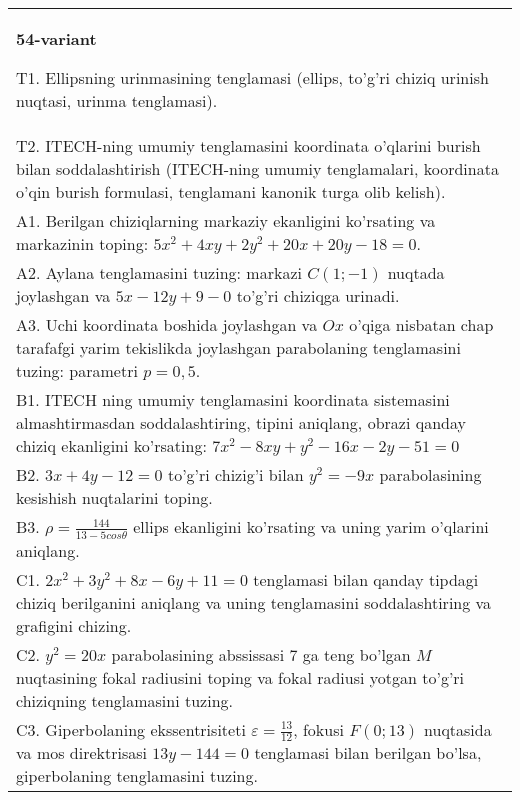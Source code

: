\documentclass{article}
\begin{document}
\begin{tabular}{m{17cm}}
\textbf{54-variant}
\newline

T1. Ellipsning urinmasining tenglamasi (ellips, to'g'ri chiziq urinish nuqtasi, urinma tenglamasi).\\

T2. ITECH-ning umumiy tenglamasini koordinata o'qlarini burish bilan soddalashtirish (ITECH-ning umumiy tenglamalari, koordinata o'qin burish formulasi, tenglamani kanonik turga olib kelish).\\

A1. Berilgan chiziqlarning markaziy ekanligini ko'rsating va markazinin toping: $5x^{2}+4xy+2y^{2}+20x+20y-18=0$.\\

A2. Aylana tenglamasini tuzing: markazi $C(1;-1)$ nuqtada joylashgan va $5x-12y+9-0$ to'g'ri chiziqga urinadi.\\

A3. Uchi koordinata boshida joylashgan va $Ox$ o'qiga nisbatan chap tarafafgi yarim tekislikda joylashgan parabolaning tenglamasini tuzing: parametri $p=0,5$.\\

B1. ITECH ning umumiy tenglamasini koordinata sistemasini almashtirmasdan soddalashtiring, tipini aniqlang, obrazi qanday chiziq ekanligini ko'rsating: $7x^{2} - 8xy + y^{2} - 16x - 2y - 51 = 0$\\

B2. $3x + 4y - 12 = 0$ to'g'ri chizig'i bilan $y^{2} = - 9x$ parabolasining kesishish nuqtalarini toping.  \\

B3. $\rho = \frac{144}{13 - 5cos\theta}$ ellips ekanligini ko'rsating va uning yarim o'qlarini aniqlang.\\

C1. $2x^{2} + 3y^{2} + 8x - 6y + 11 = 0$ tenglamasi bilan qanday tipdagi chiziq berilganini aniqlang va uning tenglamasini soddalashtiring va grafigini chizing.  \\

C2. $y^{2} = 20x$ parabolasining abssissasi 7 ga teng bo'lgan $M$ nuqtasining fokal radiusini toping va fokal radiusi yotgan to'g'ri chiziqning tenglamasini tuzing.  \\

C3. Giperbolaning ekssentrisiteti $\varepsilon = \frac{13}{12}$, fokusi $F(0;13)$ nuqtasida va mos direktrisasi $13y - 144 = 0$ tenglamasi bilan berilgan bo'lsa, giperbolaning tenglamasini tuzing.  \\

\end{tabular}
\vspace{1cm}
\end{document}
